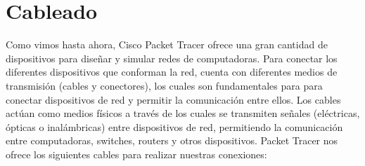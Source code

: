 \documentclass{article}
\begin{document}
\section{Cableado}
Como vimos hasta ahora, Cisco Packet Tracer ofrece una gran cantidad de dispositivos para diseñar y simular redes de computadoras. Para conectar los diferentes dispositivos que conforman la red, cuenta con diferentes medios de transmisión (cables y conectores), los cuales son fundamentales para  para conectar dispositivos de red y permitir la comunicación entre ellos. Los cables actúan como medios físicos a través de los cuales se transmiten señales (eléctricas, ópticas o inalámbricas) entre dispositivos de red, permitiendo la comunicación entre computadoras, switches, routers y otros dispositivos. Packet Tracer nos ofrece los siguientes cables para realizar nuestras conexiones:
\end{document}
